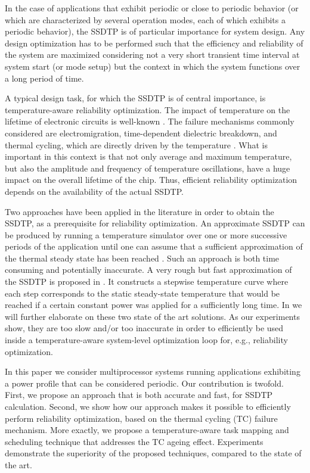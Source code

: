 In the case of applications that exhibit periodic or close to periodic behavior
(or which are characterized by several operation modes, each of which exhibits a
periodic behavior), the SSDTP is of particular importance for system design. Any
design optimization has to be performed such that the efficiency and reliability
of the system are maximized considering not a very short transient time interval
at system start (or mode setup) but the context in which the system functions
over a long period of time.

A typical design task, for which the SSDTP is of central importance, is
temperature-aware reliability optimization. The impact of temperature on the
lifetime of electronic circuits is well-known \cite{srinivasan2004, coskun2006,
xiang2010, jedec2010}. The failure mechanisms commonly considered are
electromigration, time-dependent dielectric breakdown, and thermal cycling,
which are directly driven by the temperature \cite{jedec2010}. What is important
in this context is that not only average and maximum temperature, but also the
amplitude and frequency of temperature oscillations, have a huge impact on the
overall lifetime of the chip. Thus, efficient reliability optimization depends
on the availability of the actual SSDTP.

Two approaches have been applied in the literature in order to obtain the SSDTP,
as a prerequisite for reliability optimization. An approximate SSDTP can be
produced by running a temperature simulator over one or more successive periods
of the application until one can assume that a sufficient approximation of the
thermal steady state has been reached \cite{srinivasan2004}. Such an approach is
both time consuming and potentially inaccurate. A very rough but fast
approximation of the SSDTP is proposed in \cite{huang2009}. It constructs a
stepwise temperature curve where each step corresponds to the static
steady-state temperature that would be reached if a certain constant power was
applied for a sufficiently long time. In  we will further
elaborate on these two state of the art solutions. As our experiments show, they
are too slow and/or too inaccurate in order to efficiently be used inside a
temperature-aware system-level optimization loop for, e.g., reliability
optimization.

In this paper we consider multiprocessor systems running applications exhibiting
a power profile that can be considered periodic. Our contribution is twofold.
First, we propose an approach that is both accurate and fast, for SSDTP
calculation. Second, we show how our approach makes it possible to efficiently
perform reliability optimization, based on the thermal cycling (TC) failure
mechanism. More exactly, we propose a temperature-aware task mapping and
scheduling technique that addresses the TC ageing effect. Experiments
demonstrate the superiority of the proposed techniques, compared to the state of
the art.

